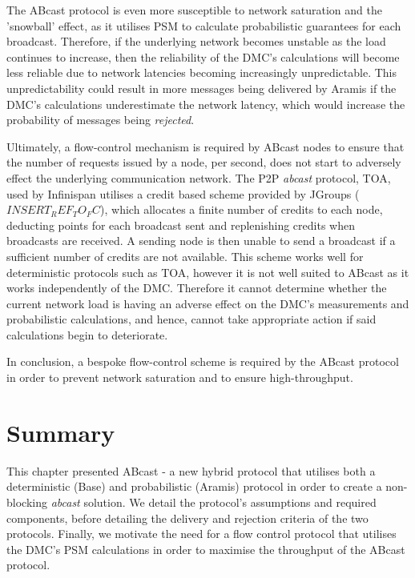 The \textsf{ABcast} protocol is even more susceptible to network saturation and the 'snowball' effect, as it utilises PSM to calculate probabilistic guarantees for each broadcast. Therefore, if the underlying network becomes unstable as the load continues to increase, then the reliability of the DMC's calculations will become less reliable due to network latencies becoming increasingly unpredictable.  This unpredictability could result in more messages being delivered by \textsf{Aramis} if the DMC's calculations underestimate the network latency, which would increase the probability of messages being \emph{rejected}.  

Ultimately, a flow-control mechanism is required by \textsf{ABcast} nodes to ensure that the number of requests issued by a node, per second, does not start to adversely effect the underlying communication network.  The P2P \emph{abcast} protocol, TOA, used by Infinispan utilises a credit based scheme provided by JGroups ($INSERT_REF_TO_FC$), which allocates a finite number of credits to each node, deducting points for each broadcast sent and replenishing credits when broadcasts are received.  A sending node is then unable to send a broadcast if a sufficient number of credits are not available.  This scheme works well for deterministic protocols such as TOA, however it is not well suited to \textsf{ABcast} as it works independently of the DMC.  Therefore it cannot determine whether the current network load is having an adverse effect on the DMC's measurements and probabilistic calculations, and hence, cannot take appropriate action if said calculations begin to deteriorate.  

In conclusion, a bespoke flow-control scheme is required by the \textsf{ABcast} protocol in order to prevent network saturation and to ensure high-throughput.  

\section{Summary}
This chapter presented \textsf{ABcast} - a new hybrid protocol that utilises both a deterministic (\textsf{Base}) and probabilistic (\textsf{Aramis}) protocol in order to create a non-blocking \emph{abcast} solution.  We detail the protocol's assumptions and required components, before detailing the delivery and rejection criteria of the two protocols.  Finally, we motivate the need for a flow control protocol that utilises the DMC's PSM calculations in order to maximise the throughput of the \textsf{ABcast}  protocol.  